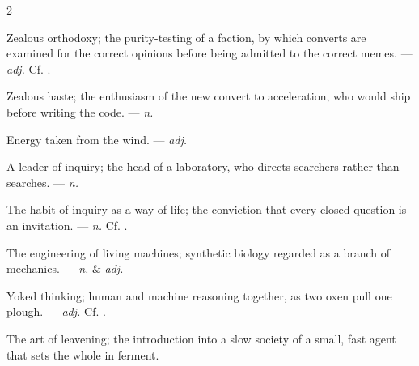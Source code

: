\begin{multicols}{2}

 Zealous orthodoxy; the purity-testing of a faction, by which converts are examined for the correct opinions before being admitted to the correct memes. —  \textit{adj.} Cf. .

 Zealous haste; the enthusiasm of the new convert to acceleration, who would ship before writing the code. —  \textit{n.}

 Energy taken from the wind. —  \textit{adj.}

 A leader of inquiry; the head of a laboratory, who directs searchers rather than searches. —  \textit{n.}

 The habit of inquiry as a way of life; the conviction that every closed question is an invitation. —  \textit{n.} Cf. .

 The engineering of living machines; synthetic biology regarded as a branch of mechanics. —  \textit{n.} \& \textit{adj.}

 Yoked thinking; human and machine reasoning together, as two oxen pull one plough. —  \textit{adj.} Cf. .

 The art of leavening; the introduction into a slow society of a small, fast agent that sets the whole in ferment.

\end{multicols}
